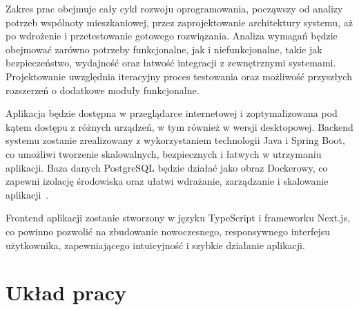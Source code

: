 Zakres prac obejmuje cały cykl rozwoju oprogramowania, począwszy od analizy potrzeb wspólnoty mieszkaniowej, przez zaprojektowanie architektury systemu, aż po wdrożenie i przetestowanie gotowego rozwiązania. Analiza wymagań będzie obejmować zarówno potrzeby funkcjonalne, jak i niefunkcjonalne, takie jak bezpieczeństwo, wydajność oraz łatwość integracji z zewnętrznymi systemami. Projektowanie uwzględnia iteracyjny proces testowania oraz możliwość przyszłych rozszerzeń o dodatkowe moduły funkcjonalne.

Aplikacja będzie dostępna w przeglądarce internetowej i zoptymalizowana pod kątem dostępu z różnych urządzeń, w tym również w wersji desktopowej. Backend systemu zostanie zrealizowany z wykorzystaniem technologii Java i Spring Boot, co umożliwi tworzenie skalowalnych, bezpiecznych i łatwych w utrzymaniu aplikacji. Baza danych PostgreSQL będzie działać jako obraz Dockerowy, co zapewni izolację środowiska oraz ułatwi wdrażanie, zarządzanie i skalowanie aplikacji~\cite{EARTHLY}.

Frontend aplikacji zostanie stworzony w języku TypeScript i frameworku Next.js, co powinno pozwolić na zbudowanie nowoczesnego, responsywnego interfejsu użytkownika, zapewniającego intuicyjność i szybkie działanie aplikacji.

\section{Układ pracy}
